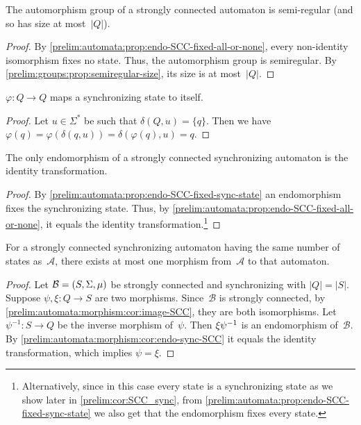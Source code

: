 \begin{corollary} \label{prelim:automata:morphism:prop:endo-SCC-is-iso-b}
    The automorphism group of a strongly connected automaton is semi-regular (and so has size at most~$|Q|$).
\end{corollary}
\begin{proof}
	By  \cref{prelim:automata:prop:endo-SCC-fixed-all-or-none}, every non-identity isomorphism
	fixes no state.
	Thus, the automorphism group is semiregular.
	By \cref{prelim:groups:prop:semiregular-size}, 
	its size is at most~$|Q|$.	
\end{proof}

\begin{proposition} \label{prelim:automata:prop:endo-SCC-fixed-sync-state}
	$\varphi \colon Q \to Q$ maps a synchronizing state to itself.
\end{proposition}
\begin{proof}
	Let $u \in \Sigma^*$ be such that $\delta(Q, u) = \{q\}$.
	Then we have $\varphi(q) = \varphi(\delta(q, u)) = \delta(\varphi(q), u) = q$.
\end{proof}

\begin{corollary} \label{prelim:automata:morphism:cor:endo-sync-SCC}
	The only endomorphism of a strongly connected synchronizing automaton
	is the identity transformation.
\end{corollary}
\begin{proof}
	By \cref{prelim:automata:prop:endo-SCC-fixed-sync-state}
	an endomorphism fixes the synchronizing state.
	Thus, by \cref{prelim:automata:prop:endo-SCC-fixed-all-or-none},
	it equals the identity transformation.\footnote{Alternatively,
	since in this case every state is a synchronizing state
	as we show later in \cref{prelim:cor:SCC_sync},
	from \cref{prelim:automata:prop:endo-SCC-fixed-sync-state}
	we also get that the endomorphism fixes every state.}		
\end{proof}

\begin{corollary}
	For a strongly connected synchronizing automaton
	having the same number of states as~$\mathcal A$,
	there exists at most one morphism from~$\mathcal A$ to that automaton.
\end{corollary}
\begin{proof}
	Let $\mathcal B = (S, \Sigma, \mu)$ be strongly connected
	and synchronizing with $|Q| = |S|$.
	Suppose $\psi, \xi \colon Q \to S$ are two morphisms.
	Since~$\mathcal B$ is strongly connected,
	by \cref{prelim:automata:morphism:cor:image-SCC}, 
	they are both isomorphisms.
	Let $\psi^{-1} \colon S \to Q$ be the inverse morphism of~$\psi$.
	Then $\xi \psi^{-1}$ is an endomorphism of~$\mathcal B$.
	By \cref{prelim:automata:morphism:cor:endo-sync-SCC} 
	it equals the identity transformation, which implies $\psi = \xi$.
\end{proof}

